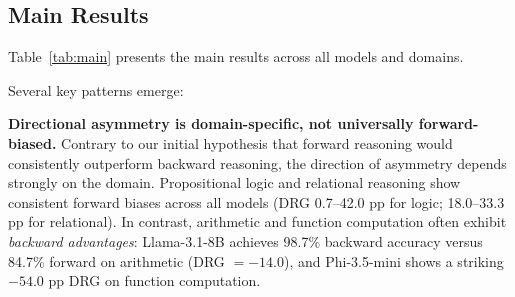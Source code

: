 \documentclass{article}
\newcommand{\flipbench}{\textsc{FlipBench}\xspace}
\begin{document}
\subsection{Main Results}

Table~\ref{tab:main} presents the main results across all models and domains.

\begin{table}[t]
\caption{Main \flipbench results (seed 42). FA = Forward Accuracy (\%), BA = Backward Accuracy (\%), DRG = FA $-$ BA (pp), CR = Consistency Rate (\%). Bold indicates the largest $|\text{DRG}|$ per domain. $\dagger$ denotes statistical significance at $p < 0.05$ (McNemar's test with Bonferroni correction).}
\label{tab:main}
\centering
{}
\end{table}

Several key patterns emerge:

\textbf{Directional asymmetry is domain-specific, not universally forward-biased.} Contrary to our initial hypothesis that forward reasoning would consistently outperform backward reasoning, the direction of asymmetry depends strongly on the domain. Propositional logic and relational reasoning show consistent forward biases across all models (DRG 0.7--42.0 pp for logic; 18.0--33.3 pp for relational). In contrast, arithmetic and function computation often exhibit \emph{backward advantages}: Llama-3.1-8B achieves 98.7\% backward accuracy versus 84.7\% forward on arithmetic (DRG $= -14.0$), and Phi-3.5-mini shows a striking $-54.0$ pp DRG on function computation.
\end{document}
